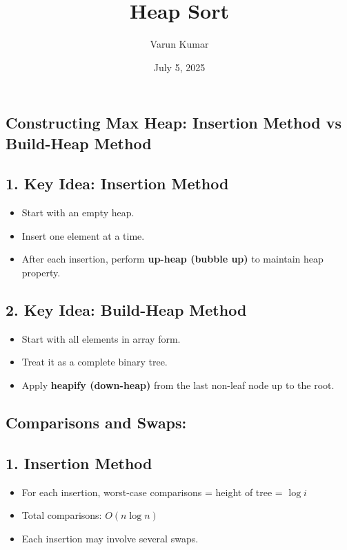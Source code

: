 \documentclass[14pt]{extarticle}
\title{\textbf{Heap Sort}}
\author{Varun Kumar}
\date{July 5, 2025}
\begin{document}
\maketitle 

\subsection*{Constructing Max Heap: Insertion Method vs Build-Heap Method}


\subsection*{1. Key Idea: Insertion Method}
\begin{itemize}
    \item Start with an empty heap.
    \item Insert one element at a time.
    \item After each insertion, perform \textbf{up-heap (bubble up)} to maintain heap property.
\end{itemize}


\subsection*{2. Key Idea: Build-Heap Method}
\begin{itemize}
    \item Start with all elements in array form.
    \item Treat it as a complete binary tree.
    \item Apply \textbf{heapify (down-heap)} from the last non-leaf node up to the root.
\end{itemize}



\vspace{0.5em}
\newpage
\subsection*{Comparisons and Swaps:}
\subsection*{1. Insertion Method}
\begin{itemize}
    \item For each insertion, worst-case comparisons = height of tree = \( \log i \)
    \item Total comparisons: \( O(n \log n) \)
    \item Each insertion may involve several swaps.
\end{itemize}
\end{document}

